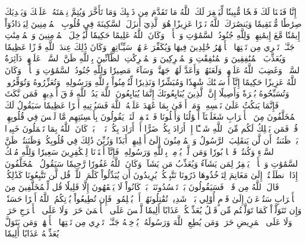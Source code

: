إِنَّا فَتَحۡنَا لَكَ فَتۡحٗا مُّبِينٗا
لِّيَغۡفِرَ لَكَ ٱللَّهُ مَا تَقَدَّمَ مِن ذَنۢبِكَ وَمَا تَأَخَّرَ وَيُتِمَّ نِعۡمَتَهُۥ عَلَيۡكَ وَيَهۡدِيَكَ صِرَٰطٗا مُّسۡتَقِيمٗا
وَيَنصُرَكَ ٱللَّهُ نَصۡرًا عَزِيزًا
هُوَ ٱلَّذِيٓ أَنزَلَ ٱلسَّكِينَةَ فِي قُلُوبِ ٱلۡمُؤۡمِنِينَ لِيَزۡدَادُوٓاْ إِيمَٰنٗا مَّعَ إِيمَٰنِهِمۡۗ وَلِلَّهِ جُنُودُ ٱلسَّمَٰوَٰتِ وَٱلۡأَرۡضِۚ وَكَانَ ٱللَّهُ عَلِيمًا حَكِيمٗا
لِّيُدۡخِلَ ٱلۡمُؤۡمِنِينَ وَٱلۡمُؤۡمِنَٰتِ جَنَّـٰتٖ تَجۡرِي مِن تَحۡتِهَا ٱلۡأَنۡهَٰرُ خَٰلِدِينَ فِيهَا وَيُكَفِّرَ عَنۡهُمۡ سَيِّـَٔاتِهِمۡۚ وَكَانَ ذَٰلِكَ عِندَ ٱللَّهِ فَوۡزًا عَظِيمٗا
وَيُعَذِّبَ ٱلۡمُنَٰفِقِينَ وَٱلۡمُنَٰفِقَٰتِ وَٱلۡمُشۡرِكِينَ وَٱلۡمُشۡرِكَٰتِ ٱلظَّآنِّينَ بِٱللَّهِ ظَنَّ ٱلسَّوۡءِۚ عَلَيۡهِمۡ دَآئِرَةُ ٱلسَّوۡءِۖ وَغَضِبَ ٱللَّهُ عَلَيۡهِمۡ وَلَعَنَهُمۡ وَأَعَدَّ لَهُمۡ جَهَنَّمَۖ وَسَآءَتۡ مَصِيرٗا
وَلِلَّهِ جُنُودُ ٱلسَّمَٰوَٰتِ وَٱلۡأَرۡضِۚ وَكَانَ ٱللَّهُ عَزِيزًا حَكِيمًا
إِنَّآ أَرۡسَلۡنَٰكَ شَٰهِدٗا وَمُبَشِّرٗا وَنَذِيرٗا
لِّتُؤۡمِنُواْ بِٱللَّهِ وَرَسُولِهِۦ وَتُعَزِّرُوهُ وَتُوَقِّرُوهُۚ وَتُسَبِّحُوهُ بُكۡرَةٗ وَأَصِيلًا
إِنَّ ٱلَّذِينَ يُبَايِعُونَكَ إِنَّمَا يُبَايِعُونَ ٱللَّهَ يَدُ ٱللَّهِ فَوۡقَ أَيۡدِيهِمۡۚ فَمَن نَّكَثَ فَإِنَّمَا يَنكُثُ عَلَىٰ نَفۡسِهِۦۖ وَمَنۡ أَوۡفَىٰ بِمَا عَٰهَدَ عَلَيۡهُ ٱللَّهَ فَسَيُؤۡتِيهِ أَجۡرًا عَظِيمٗا
سَيَقُولُ لَكَ ٱلۡمُخَلَّفُونَ مِنَ ٱلۡأَعۡرَابِ شَغَلَتۡنَآ أَمۡوَٰلُنَا وَأَهۡلُونَا فَٱسۡتَغۡفِرۡ لَنَاۚ يَقُولُونَ بِأَلۡسِنَتِهِم مَّا لَيۡسَ فِي قُلُوبِهِمۡۚ قُلۡ فَمَن يَمۡلِكُ لَكُم مِّنَ ٱللَّهِ شَيۡـًٔا إِنۡ أَرَادَ بِكُمۡ ضَرًّا أَوۡ أَرَادَ بِكُمۡ نَفۡعَۢاۚ بَلۡ كَانَ ٱللَّهُ بِمَا تَعۡمَلُونَ خَبِيرَۢا
بَلۡ ظَنَنتُمۡ أَن لَّن يَنقَلِبَ ٱلرَّسُولُ وَٱلۡمُؤۡمِنُونَ إِلَىٰٓ أَهۡلِيهِمۡ أَبَدٗا وَزُيِّنَ ذَٰلِكَ فِي قُلُوبِكُمۡ وَظَنَنتُمۡ ظَنَّ ٱلسَّوۡءِ وَكُنتُمۡ قَوۡمَۢا بُورٗا
وَمَن لَّمۡ يُؤۡمِنۢ بِٱللَّهِ وَرَسُولِهِۦ فَإِنَّآ أَعۡتَدۡنَا لِلۡكَٰفِرِينَ سَعِيرٗا
وَلِلَّهِ مُلۡكُ ٱلسَّمَٰوَٰتِ وَٱلۡأَرۡضِۚ يَغۡفِرُ لِمَن يَشَآءُ وَيُعَذِّبُ مَن يَشَآءُۚ وَكَانَ ٱللَّهُ غَفُورٗا رَّحِيمٗا
سَيَقُولُ ٱلۡمُخَلَّفُونَ إِذَا ٱنطَلَقۡتُمۡ إِلَىٰ مَغَانِمَ لِتَأۡخُذُوهَا ذَرُونَا نَتَّبِعۡكُمۡۖ يُرِيدُونَ أَن يُبَدِّلُواْ كَلَٰمَ ٱللَّهِۚ قُل لَّن تَتَّبِعُونَا كَذَٰلِكُمۡ قَالَ ٱللَّهُ مِن قَبۡلُۖ فَسَيَقُولُونَ بَلۡ تَحۡسُدُونَنَاۚ بَلۡ كَانُواْ لَا يَفۡقَهُونَ إِلَّا قَلِيلٗا
قُل لِّلۡمُخَلَّفِينَ مِنَ ٱلۡأَعۡرَابِ سَتُدۡعَوۡنَ إِلَىٰ قَوۡمٍ أُوْلِي بَأۡسٖ شَدِيدٖ تُقَٰتِلُونَهُمۡ أَوۡ يُسۡلِمُونَۖ فَإِن تُطِيعُواْ يُؤۡتِكُمُ ٱللَّهُ أَجۡرًا حَسَنٗاۖ وَإِن تَتَوَلَّوۡاْ كَمَا تَوَلَّيۡتُم مِّن قَبۡلُ يُعَذِّبۡكُمۡ عَذَابًا أَلِيمٗا
لَّيۡسَ عَلَى ٱلۡأَعۡمَىٰ حَرَجٞ وَلَا عَلَى ٱلۡأَعۡرَجِ حَرَجٞ وَلَا عَلَى ٱلۡمَرِيضِ حَرَجٞۗ وَمَن يُطِعِ ٱللَّهَ وَرَسُولَهُۥ يُدۡخِلۡهُ جَنَّـٰتٖ تَجۡرِي مِن تَحۡتِهَا ٱلۡأَنۡهَٰرُۖ وَمَن يَتَوَلَّ يُعَذِّبۡهُ عَذَابًا أَلِيمٗا
